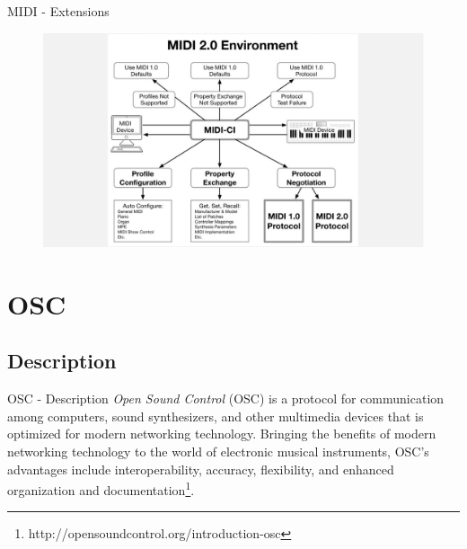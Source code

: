 \documentclass{beamer}
\begin{document}
\begin{frame}{MIDI - Extensions}
    \begin{figure}[h]
        \includegraphics[width=1.2\textwidth]{MIDI-20.jpg}
    \end{figure}
\end{frame}



\section{OSC}

\subsection{Description}

\begin{frame}{OSC - Description}
    \textit{Open Sound Control} (OSC) is a protocol for communication among computers, sound synthesizers, and other multimedia devices that is optimized for modern networking technology. Bringing the benefits of modern networking technology to the world of electronic musical instruments, OSC's advantages include interoperability, accuracy, flexibility, and enhanced organization and documentation\footnote{http://opensoundcontrol.org/introduction-osc}.
\end{frame}
\end{document}
